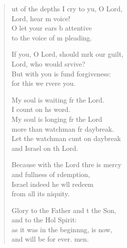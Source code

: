 \settowidth{\versewidth}{Out of the depths I cry to you, O Lord, *}
\begin{verse}%
  \begin{patverse}
ut of the depths I cry to yu, O Lord,\Med\\
    Lord, hear m voice!\\
O let your ears b attentive\Med\\
    to the voice of m pleading.

If you, O Lord, should mrk our guilt,\Med\\
    Lord, who would srvive?\\
But with you is fund forgiveness:\Med\\
    for this we rvere you.

My soul is waiting fr the Lord.\Med\\
    I count on h\pointup{\i}s word.\\
My soul is longing fr the Lord\Med\\
    more than watchman fr daybreak.\\
Let the watchman cunt on daybreak\Med\\
    and Israel on th Lord.

Because with the Lord thre is mercy\Med\\
    and fullness of rdemption,\\
Israel indeed he w\pointup{\i}ll redeem\Med\\
    from all its \pointup{\i}niquity.

Glory to the Father and t the Son,\Med\\
    and to the Hol Spirit:\\
as it was in the beginn\pointup{\i}ng, is now,\Med\\
    and will be for ever. men.
  \end{patverse}
\end{verse}
